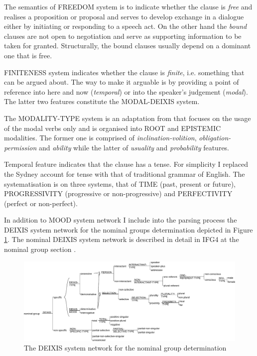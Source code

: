     The semantics of FREEDOM system is to indicate whether the clause is \textit{free} and realises a proposition or proposal and serves to develop exchange in a dialogue either by initiating or responding to a speech act. On the other hand the \textit{bound} clauses are not open to negotiation and serve as supporting information to be taken for granted. Structurally, the bound clauses usually depend on a dominant one that is free.
    
    FINITENESS system indicates whether the clause is \textit{finite}, i.e. something that can be argued about. The way to make it arguable is by providing a point of reference into here and now (\textit{temporal}) or into the speaker's judgement (\textit{modal}). The latter two features constitute the MODAL-DEIXIS system. 
    
    The MODALITY-TYPE system is an adaptation from \citep[689--692]{Halliday2013} that focuses on the usage of the modal verbs only and is organised into ROOT and EPISTEMIC modalities. The former one is comprised of \textit{inclination-volition}, \textit{obligation-permission} and \textit{ability} while the latter of \textit{usuality} and \textit{probability} features.
    
    Temporal feature indicates that the clause has a tense. For simplicity I replaced the Sydney account for tense with   that of traditional grammar of English. The systematisation is on three systems, that of TIME (past, present or future), PROGRESSIVITY (progressive or non-progressive) and PERFECTIVITY (perfect or non-perfect).    
    
    In addition to MOOD system network I include into the parsing process the DEIXIS system network for the nominal groups determination depicted in Figure \ref{fig:ng-determination}. The nominal DEIXIS system network is described in detail in IFG4 at the nominal group section \citep[364--396]{Halliday2013}. 
    
    \begin{figure}[!ht]
        \centering
        \includegraphics[width=\linewidth]{Figures/SFL-grammar/determination-system.pdf}
        \caption{The DEIXIS system network for the nominal group determination \citep[366]{Halliday2013}}
        \label{fig:ng-determination}
    \end{figure}

